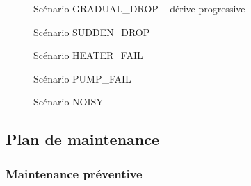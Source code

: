 \begin{figure}[htbp]
  \centering
  \caption{Scénario GRADUAL\_DROP -- dérive progressive}
  \label{fig:demo_gradual}
\end{figure}

\begin{figure}[htbp]
  \centering
  \caption{Scénario SUDDEN\_DROP}
  \label{fig:demo_sudden}
\end{figure}

\begin{figure}[htbp]
  \centering
  \caption{Scénario HEATER\_FAIL}
  \label{fig:demo_heater}
\end{figure}

\begin{figure}[htbp]
  \centering
  \caption{Scénario PUMP\_FAIL}
  \label{fig:demo_pump}
\end{figure}

\begin{figure}[htbp]
  \centering
  \caption{Scénario NOISY}
  \label{fig:demo_noisy}
\end{figure}

\subsection{Plan de maintenance}

\subsubsection{Maintenance préventive}


